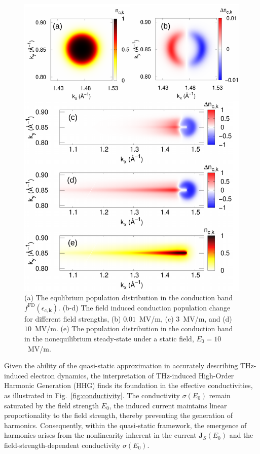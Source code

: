 \begin{figure}[htbp]
	\centering
	\includegraphics[width=1.0\linewidth]{pic/pop_fig.pdf}
	\caption{\label{fig:pop_f}
		(a) The equlibrium population distribution in the conduction band $f^{\mathrm{FD}}(\epsilon_{c,\mathbf k})$. (b-d) The field induced conduction population change for different field strengths, (b) $0.01$~MV/m, (c) $3$~MV/m, and (d) $10$~MV/m. (e) The population distribution in the conduction band in the nonequilibrium steady-state under a static field, $E_0=10$~MV/m.}
\end{figure}

Given the ability of the quasi-static approximation in accurately describing THz-induced electron
dynamics, the interpretation of THz-induced High-Order Harmonic Generation (HHG) finds its
foundation in the effective conductivities, as illustrated in Fig.~\ref{fig:conductivity}. The
conductivity $\sigma(E_0)$ remain saturated by the field strength $E_0$, the induced current
maintains linear proportionality to the field strength, thereby preventing the generation of
harmonics. Consequently, within the quasi-static framework, the emergence of harmonics arises from
the nonlinearity inherent in the current $\mathbf J_S(E_0)$ and the field-strength-dependent
conductivity $\sigma(E_0)$.

